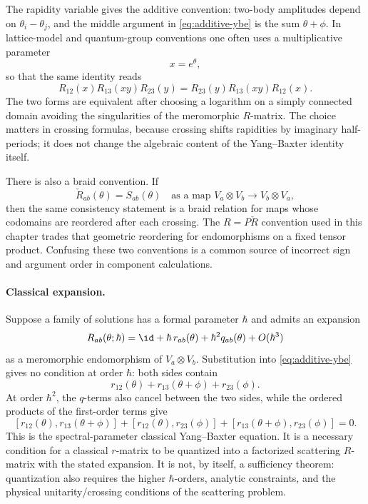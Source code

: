 The rapidity variable gives the additive convention: two-body amplitudes depend
on \(\theta_i-\theta_j\), and the middle argument in
\eqref{eq:additive-ybe} is the sum \(\theta+\phi\).  In lattice-model and
quantum-group conventions one often uses a multiplicative parameter
\[
  x=e^\theta ,
\]
so that the same identity reads
\[
  R_{12}(x)R_{13}(xy)R_{23}(y)
  =
  R_{23}(y)R_{13}(xy)R_{12}(x).
\]
The two forms are equivalent after choosing a logarithm on a simply connected
domain avoiding the singularities of the meromorphic \(R\)-matrix.  The
choice matters in crossing formulas, because crossing shifts rapidities by
imaginary half-periods; it does not change the algebraic content of the
Yang--Baxter identity itself.

There is also a braid convention.  If
\[
  \check R_{ab}(\theta)=S_{ab}(\theta)
  \quad\text{as a map }V_a\otimes V_b\to V_b\otimes V_a,
\]
then the same consistency statement is a braid relation for maps whose
codomains are reordered after each crossing.  The \(R=P\check R\) convention
used in this chapter trades that geometric reordering for endomorphisms on a
fixed tensor product.  Confusing these two conventions is a common source of
incorrect sign and argument order in component calculations.

\paragraph{Classical expansion.}
Suppose a family of solutions has a formal parameter \(\hbar\) and admits an
expansion
\[
  R_{ab}(\theta;\hbar)
  =
  \id+\hbar\, r_{ab}(\theta)+\hbar^2 q_{ab}(\theta)+O(\hbar^3)
\]
as a meromorphic endomorphism of \(V_a\otimes V_b\).  Substitution into
\eqref{eq:additive-ybe} gives no condition at order \(\hbar\): both sides
contain
\[
  r_{12}(\theta)+r_{13}(\theta+\phi)+r_{23}(\phi).
\]
At order \(\hbar^2\), the \(q\)-terms also cancel between the two sides, while
the ordered products of the first-order terms give
\begin{equation}
\label{eq:spectral-classical-ybe}
  [r_{12}(\theta),r_{13}(\theta+\phi)]
  +
  [r_{12}(\theta),r_{23}(\phi)]
  +
  [r_{13}(\theta+\phi),r_{23}(\phi)]
  =
  0 .
\end{equation}
This is the spectral-parameter classical Yang--Baxter equation.  It is a
necessary condition for a classical \(r\)-matrix to be quantized into a
factorized scattering \(R\)-matrix with the stated expansion.  It is not, by
itself, a sufficiency theorem: quantization also requires the higher
\(\hbar\)-orders, analytic constraints, and the physical unitarity/crossing
conditions of the scattering problem.

